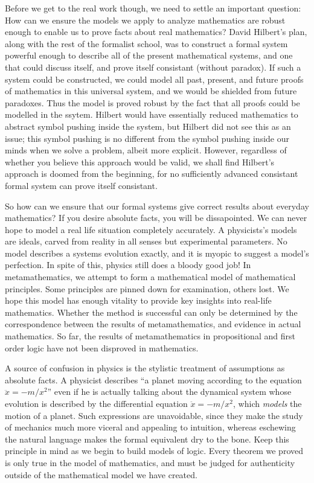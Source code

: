 Before we get to the real work though, we need to settle an important question: How can we ensure the models we apply to analyze mathematics are robust enough to enable us to prove facts about real mathematics? David Hilbert's plan, along with the rest of the formalist school, was to construct a formal system powerful enough to describe all of the present mathematical systems, and one that could discuss itself, and prove itself consistant (without paradox). If such a system could be constructed, we could model all past, present, and future proofs of mathematics in this universal system, and we would be shielded from future paradoxes. Thus the model is proved robust by the fact that all proofs could be modelled in the ssytem. Hilbert would have essentially reduced mathematics to abstract symbol pushing inside the system, but Hilbert did not see this as an issue; this symbol pushing is no different from the symbol pushing inside our minds when we solve a problem, albeit more explicit. However, regardless of whether you believe this approach would be valid, we shall find Hilbert's approach is doomed from the beginning, for no sufficiently advanced consistant formal system can prove itself consistant.

So how can we ensure that our formal systems give correct results about everyday mathematics? If you desire absolute facts, you will be dissapointed. We can never hope to model a real life situation completely accurately. A physicists's models are ideals, carved from reality in all senses but experimental parameters. No model describes a systems evolution exactly, and it is myopic to suggest a model's perfection. In spite of this, physics still does a bloody good job! In metamathematics, we attempt to form a mathematical model of mathematical principles. Some principles are pinned down for examination, others lost. We hope this model has enough vitality to provide key insights into real-life mathematics. Whether the method is successful can only be determined by the correspondence between the results of metamathematics, and evidence in actual mathematics. So far, the results of metamathematics in propositional and first order logic have not been disproved in mathematics.

A source of confusion in physics is the stylistic treatment of assumptions as absolute facts. A physicist describes ``a planet moving according to the equation $\ddot{x} = -m/x^2$'' even if he is actually talking about the dynamical system whose evolution is described by the differential equation $\ddot{x} = -m/x^2$, which {\it models} the motion of a planet. Such expressions are unavoidable, since they make the study of mechanics much more viceral and appealing to intuition, whereas eschewing the natural language makes the formal equivalent dry to the bone. Keep this principle in mind as we begin to build models of logic. Every theorem we proved is only true in the model of mathematics, and must be judged for authenticity outside of the mathematical model we have created.






